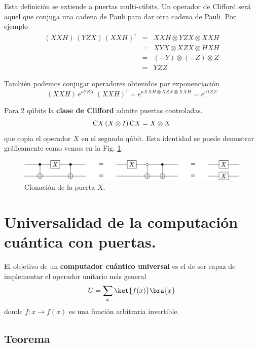 \documentclass[a4paper,11pt]{book} %
\numberwithin{equation}{chapter}
\newcommand{\cg}[1]{{\rm C}#1}
\begin{document}
Esta definición se extiende a puertas multi-cúbits. Un operador de Clifford será aquel que conjuga una cadena de Pauli para dar otra cadena de Pauli. Por ejemplo
	\begin{eqnarray*}
	(XXH) \, (YZX) \,  (XXH)^\dagger &=& XXH \otimes YZX \otimes XXH \\ 
	&=& XYX \otimes  XZX \otimes HXH \\ 
	&=& (-Y)\otimes (-Z) \otimes Z \\ 
	&=& YZZ
	\end{eqnarray*}

También podemos conjugar operadores obtenidos por exponenciación
	\begin{equation}
	(XXH) \, e^{aYZX} \,  (XXH)^\dagger =e^{a XXH \otimes XZX \otimes XXH} =  e^{a YZZ}
	\end{equation}

Para 2 qúbits la \textbf{clase de Clifford} admite puertas controladas.
\begin{equation}
\cg{X} \, (X\otimes I)\,  \cg{X} = X \otimes X
\end{equation}
que copia el operador $X$ en el segundo qúbit. Esta identidad se puede demostrar gráficamente como vemos en la Fig. \ref{Fig_elementos_clone_X}.
	\begin{figure}[H]
	\centering 
	\includegraphics[width=0.9\linewidth]{Figuras/Fig_elementos_clone_X.png}
	\caption{Clonación de la puerta $X$.}
	\label{Fig_elementos_clone_X}
	\end{figure}


	\section{Universalidad de la computación cuántica con puertas.} \label{sec_elementos_universalidad}

El objetivo de un \textbf{computador cuántico universal} es el de ser capaz de implementar el operador unitario más general
	\begin{equation}
	U  = \sum_x \ket{f(x)}\bra{x}
	\end{equation}
donde $f: x \to f(x)$ es una función arbitraria invertible.

    	\subsection{Teorema}
\end{document}
